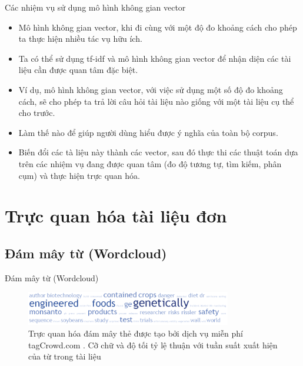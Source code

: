 \documentclass[10pt]{beamer}
\theoremstyle{remark}
\theoremstyle{definition}
\begin{document}
\begin{frame}{Các nhiệm vụ sử dụng mô hình không gian vector}
	\begin{itemize}
		\item Mô hình không gian vector, khi đi cùng với một độ đo khoảng cách cho phép ta thực hiện nhiều tác vụ hữu ích.
		\item Ta có thể sử dụng tf-idf và mô hình không gian vector để nhận diện các tài liệu cần được quan tâm đặc biệt.
		\item Ví dụ, mô hình không gian vector, với việc sử dụng một số độ đo khoảng cách, sẽ cho phép ta trả lời câu hỏi tài liệu nào giống với một tài liệu cụ thể cho trước.
		\item Làm thế nào để giúp người dùng hiểu được ý nghĩa của toàn bộ corpus.
		\item Biến đổi các tà liệu này thành các vector, sau đó thực thi các thuật toán dựa trên các nhiệm vụ đang được quan tâm (đo độ tương tự, tìm kiếm, phân cụm) và thực hiện trực quan hóa.
	\end{itemize}
\end{frame}

\section{Trực quan hóa tài liệu đơn}

\subsection{Đám mây từ (Wordcloud)}

\begin{frame}{Đám mây từ (Wordcloud)}
	\begin{figure}[h!]
        \centering
        \includegraphics[width=0.8\textwidth]{4.png}
        \caption{Trực quan hóa đám mây thẻ được tạo bởi dịch vụ miễn phí tagCrowd.com \cite{396}.
        Cỡ chữ và độ tối tỷ lệ thuận với tuần suất xuất hiện của từ trong tài liệu}
        \label{fig:4}
    \end{figure}
\end{frame}
\end{document}
